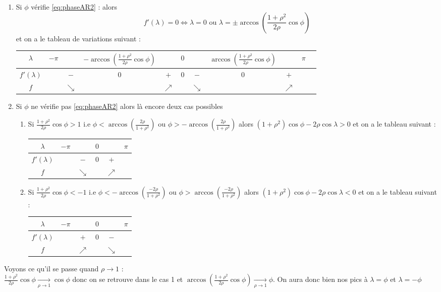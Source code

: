 \documentclass{report}
\begin{document}
\begin{enumerate}
\item Si $\phi$ vérifie \eqref{eq:phaseAR2} : alors 
$$
f'(\lambda)=0 \iff \lambda = 0 \mbox{ ou } \lambda = \pm \arccos\left(\frac{1+\rho^2}{2\rho} \cos{\phi}\right)
$$
et on a le tableau de variations suivant : \\
\begin{center}
\begin{tabular}{c|cccccccccc}
$\lambda$ & $-\pi$ & & $-\arccos\left(\frac{1+\rho^2}{2\rho} \cos{\phi}\right)$ & & $0$ & & $\arccos\left(\frac{1+\rho^2}{2\rho} \cos{\phi}\right)$ & & $\pi$  \\
\hline
$f'(\lambda)$ & & $-$ & $0$ & $+$ & $0$ & $-$ & $0$ & $+$ & \\
\hline
$f$ & & $\searrow$ & & $\nearrow$ & & $\searrow$ & & $\nearrow$ \\
\end{tabular}
\end{center}
\item Si $\phi$ ne vérifie pas \eqref{eq:phaseAR2} alors là encore deux cas possibles
\begin{enumerate}
\item Si $\frac{1+\rho^2}{2\rho} \cos{\phi} > 1$ i.e $\phi < \arccos\left( \frac{2\rho}{1+\rho^2} \right)$ ou $\phi > -\arccos\left( \frac{2\rho}{1+\rho^2} \right)$ alors $(1+\rho^2)\cos{\phi} - 2\rho \cos{\lambda} >0$ et on a le tableau suivant :
\begin{center}
\begin{tabular}{c|ccccc}
$\lambda$ & $-\pi$ & & $0$ & & $\pi$  \\
\hline
$f'(\lambda)$ & & $-$ & $0$ & $+$ & \\
\hline
$f$ & & $\searrow$ & & $\nearrow$ & \\
\end{tabular}
\end{center}
\item Si $\frac{1+\rho^2}{2\rho} \cos{\phi} < -1$ i.e $\phi < -\arccos\left( \frac{-2\rho}{1+\rho^2} \right)$ ou $\phi > \arccos\left( \frac{-2\rho}{1+\rho^2} \right)$ alors $(1+\rho^2)\cos{\phi} - 2\rho \cos{\lambda} <0$ et on a le tableau suivant :
\begin{center}
\begin{tabular}{c|ccccc}
$\lambda$ & $-\pi$ & & $0$ & & $\pi$  \\
\hline
$f'(\lambda)$ & & $+$ & $0$ & $-$ & \\
\hline
$f$ & & $\nearrow$ & & $\searrow$ & \\
\end{tabular}
\end{center}
\end{enumerate}
\end{enumerate}
Voyons ce qu'il se passe quand $\rho \to 1$ : \\
$\frac{1+\rho^2}{2\rho} \cos{\phi}  \xrightarrow[\rho \to 1]{} \cos{\phi}$ donc on se retrouve dans le cas 1 et $\arccos\left(\frac{1+\rho^2}{2\rho} \cos{\phi}\right) \xrightarrow[\rho \to 1]{} \phi$. On aura donc bien nos pics à $\lambda = \phi$ et $\lambda = -\phi$
\end{document}
